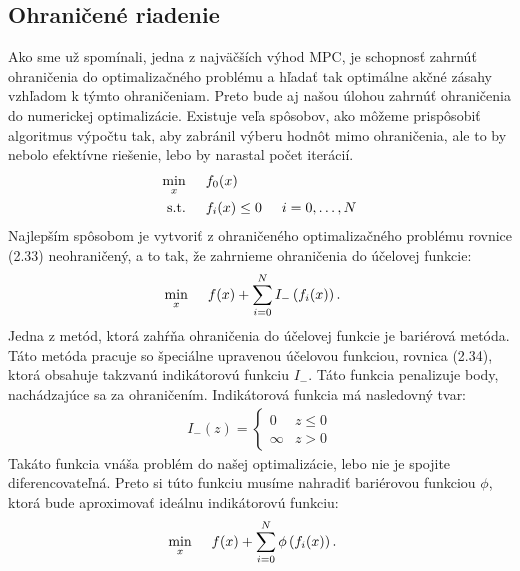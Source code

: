 \subsection{Ohraničené riadenie}
\label{subse:Ohranicenia}
Ako sme už spomínali, jedna z najväčších výhod MPC, je schopnosť zahrnúť ohraničenia do optimalizačného problému a hľadať tak optimálne akčné zásahy vzhľadom k týmto ohraničeniam. Preto bude aj našou úlohou zahrnúť ohraničenia do numerickej optimalizácie. Existuje veľa spôsobov, ako môžeme prispôsobiť algoritmus výpočtu tak, aby zabránil výberu hodnôt mimo ohraničenia, ale to by nebolo efektívne riešenie, lebo by narastal počet iterácií. 
\begin{subequations}
	\begin{align}
	\displaystyle \min_{x} \hspace{0.5cm} & 
	f_{0}(x)\\
	\textrm{s.t.} \hspace{0.5cm} & f_{i}(x) \leq 0 \hspace{0.5cm} i=0,\dots,N
	\end{align}
\end{subequations}
Najlepším spôsobom je vytvoriť z ohraničeného optimalizačného problému rovnice (2.33) neohraničený, a to tak, že zahrnieme ohraničenia do účelovej funkcie: 
\begin{align}
\displaystyle \min_{x} \hspace{0.5cm} & 
f(x) + \sum_{i=0}^{N}I_{-}\left(f_{i}(x)\right).
\end{align}
Jedna z metód, ktorá zahŕňa ohraničenia do účelovej funkcie je bariérová metóda. Táto metóda pracuje so špeciálne upravenou účelovou funkciou, rovnica (2.34), ktorá obsahuje takzvanú indikátorovú funkciu $I_{-}$. Táto funkcia penalizuje body, nachádzajúce sa za ohraničením. Indikátorová funkcia má nasledovný tvar:
\begin{align}
	I_{-}(z) =
	\begin{cases}
		0 & z \leq 0\\
		\infty & z > 0
	\end{cases}
\end{align}
Takáto funkcia vnáša problém do našej optimalizácie, lebo nie je spojite diferencovateľná. Preto si túto funkciu musíme nahradiť bariérovou funkciou $\phi$, ktorá bude aproximovať ideálnu indikátorovú funkciu:
\begin{align}
\displaystyle \min_{x} \hspace{0.5cm} & 
f(x) + \sum_{i=0}^{N}\phi\left(f_{i}(x)\right).
\end{align}

